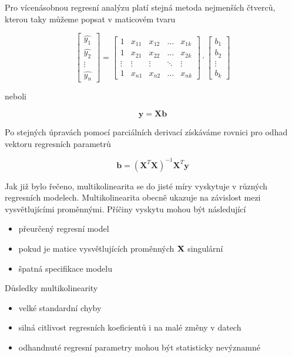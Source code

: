 \documentclass[a4paper,12pt,twoside]{scrreprt}
\begin{document}
Pro vícenásobnou regresní analýzu platí stejná metoda nejmenších čtverců, kterou taky můžeme popsat v maticovém tvaru 

$$
\begin{bmatrix}
\hat{y_1} \\
\hat{y_2} \\
\vdots \\
\hat{y_n}
\end{bmatrix}
=
\begin{bmatrix}
1 & x_{11} & x_{12} & \ldots & x_{1k} \\
1 & x_{21} & x_{22} & \ldots & x_{2k} \\
\vdots & \vdots & \vdots & \ddots & \vdots \\
1 & x_{n1} & x_{n2} & \ldots & x_{nk}
\end{bmatrix}
\cdot
\begin{bmatrix}
b_1 \\
b_2 \\
\vdots \\
b_k
\end{bmatrix}
$$

neboli 

\begin{equation}
\mathbf{y} = \mathbf{Xb}
\end{equation}

Po stejných úpravách pomocí parciálních derivací získáváme rovnici pro odhad vektoru regresních parametrů

\begin{equation}
\mathbf{b} = (\mathbf{X}^T\mathbf{X})^{-1}\mathbf{X}^T\mathbf{y}
\end{equation}

Jak již bylo řečeno, multikolinearita se do jisté míry vyskytuje v různých regresních modelech. Multikolinearita obecně ukazuje na závislost mezi vysvětlujícími proměnnými. Příčiny vyskytu mohou být následující

\begin{itemize}
\item přeurčený regresní model
\item pokud je matice vysvětlujících proměnných $\bf{X}$ singulární
\item špatná specifikace modelu
\end{itemize}

Důsledky multikolinearity

\begin{itemize}
\item velké standardní chyby
\item silná citlivost regresních koeficientů i na malé změny v datech
\item odhandnuté regresní parametry mohou být statisticky nevýznamné
\end{itemize}
\end{document}
